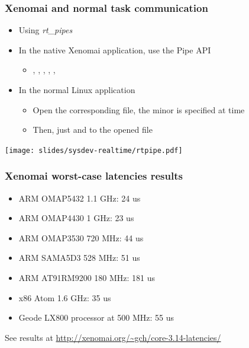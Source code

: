 \begin{frame}
  \frametitle{Xenomai and normal task communication}
  \begin{itemize}
  \item Using {\em rt\_pipes}
  \item In the native Xenomai application, use the Pipe API
    \begin{itemize}
    \item {}, ,
      , ,
      , 
    \end{itemize}
  \item In the normal Linux application
    \begin{itemize}
    \item Open the corresponding  file, the minor is specified at
       time
    \item Then, just  and  to the opened file
    \end{itemize}
  \end{itemize}
  \begin{center}
    \texttt{[image: slides/sysdev-realtime/rtpipe.pdf]}
  \end{center}
\end{frame}

\begin{frame}
  \frametitle{Xenomai worst-case latencies results}
  \begin{itemize}
  \item ARM OMAP5432 1.1 GHz: 24 us
  \item ARM OMAP4430 1 GHz: 23 us
  \item ARM OMAP3530 720 MHz: 44 us
  \item ARM SAMA5D3 528 MHz: 51 us
  \item ARM AT91RM9200 180 MHz: 181 us
  \item x86 Atom 1.6 GHz: 35 us
  \item Geode LX800 processor at 500 MHz: 55 us
  \end{itemize}
  See results at \url{http://xenomai.org/~gch/core-3.14-latencies/}
\end{frame}

